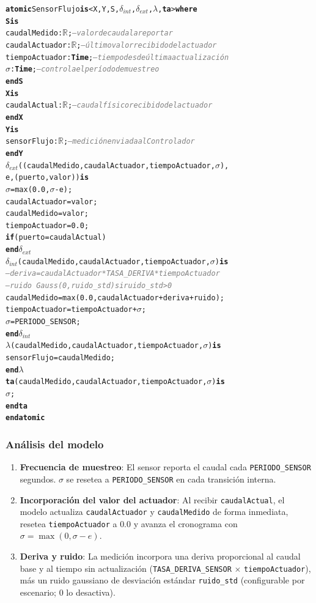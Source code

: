 \documentclass[12pt,a4paper]{article}
\newcommand{\kw}[1]{\textbf{#1}}
\newcommand{\cmlR}{$\mathbb{R}$}
\newcommand{\cmlTime}{\textbf{Time}}
\newcommand{\cmlsigma}{$\sigma$}
\newcommand{\dint}{$\delta_{\mathit{int}}$}
\newcommand{\dext}{$\delta_{\mathit{ext}}$}
\newcommand{\clambda}{$\lambda$}
\newcommand{\cmlta}{\textbf{ta}}
\newcommand{\cmlcomment}[1]{\textit{\textcolor{gray}{#1}}}
\newenvironment{cmldevs}{%
  \begin{alltt}\small%
}{%
  \end{alltt}%
}
\begin{document}
\begin{center}
\begin{cmldevs}
\kw{atomic} SensorFlujo \kw{is} <X, Y, S, \dint{}, \dext{}, \clambda{}, \cmlta{}> \kw{where}
\kw{S is}
    caudalMedido    : \cmlR{};     \cmlcomment{-- valor de caudal a reportar}
    caudalActuador  : \cmlR{};     \cmlcomment{-- último valor recibido del actuador}
    tiempoActuador  : \cmlTime{};  \cmlcomment{-- tiempo desde última actualización}
    \cmlsigma{}               : \cmlTime{}; \cmlcomment{-- controla el período de muestreo}
\kw{end S}
\kw{X is}
    caudalActual : \cmlR{};  \cmlcomment{-- caudal físico recibido del actuador}
\kw{end X}
\kw{Y is}
    sensorFlujo  : \cmlR{};  \cmlcomment{-- medición enviada al Controlador}
\kw{end Y}
\dext{}((caudalMedido, caudalActuador, tiempoActuador, \cmlsigma{}),
       e, (puerto, valor)) \kw{is}
    \cmlsigma{}     = max(0.0, \cmlsigma{} - e);
    caudalActuador  = valor;
    caudalMedido    = valor;
    tiempoActuador  = 0.0;
        \kw{if} (puerto = caudalActual)
\kw{end} \dext{}
\dint{}(caudalMedido, caudalActuador, tiempoActuador, \cmlsigma{}) \kw{is}
    \cmlcomment{-- deriva = caudalActuador * TASA\_DERIVA * tiempoActuador}
    \cmlcomment{-- ruido  ~ Gauss(0, ruido\_std)  si ruido\_std > 0}
    caudalMedido   = max(0.0, caudalActuador + deriva + ruido);
    tiempoActuador = tiempoActuador + \cmlsigma{};
    \cmlsigma{}    = PERIODO\_SENSOR;
\kw{end} \dint{}
\clambda{}(caudalMedido, caudalActuador, tiempoActuador, \cmlsigma{}) \kw{is}
    sensorFlujo = caudalMedido;
\kw{end} \clambda{}
\cmlta{}(caudalMedido, caudalActuador, tiempoActuador, \cmlsigma{}) \kw{is}
    \cmlsigma{};
\kw{end} \cmlta{}
\kw{end atomic}
\end{cmldevs}
\label{fig:sensor-flujo}
\end{center}

\subsubsection*{Análisis del modelo}

\begin{enumerate}
    \item \textbf{Frecuencia de muestreo}: El sensor reporta el caudal
    cada \texttt{PERIODO\_SENSOR} segundos.  $\sigma$ se resetea a
    \texttt{PERIODO\_SENSOR} en cada transición interna.

    \item \textbf{Incorporación del valor del actuador}: Al recibir
    \texttt{caudalActual}, el modelo actualiza \texttt{caudalActuador}
    y \texttt{caudalMedido} de forma inmediata, resetea
    \texttt{tiempoActuador} a $0.0$ y avanza el cronograma con
    $\sigma = \max(0, \sigma - e)$.

    \item \textbf{Deriva y ruido}: La medición incorpora una deriva
    proporcional al caudal base y al tiempo sin actualización
    (\texttt{TASA\_DERIVA\_SENSOR} $\times$ \texttt{tiempoActuador}),
    más un ruido gaussiano de desviación estándar
    \texttt{ruido\_std} (configurable por escenario; $0$ lo desactiva).
\end{enumerate}
\end{document}
